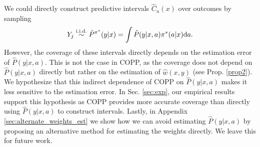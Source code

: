 \begin{importantresultwithtitle}[title=Why not construct intervals using \text{$\hat{P}(y|x, a)$} directly?]\noindent
    We could directly construct predictive intervals $\hat{C}_n(x)$ over outcomes by sampling $$Y_j \overset{\textup{i.i.d.}}{\sim} \hat{P}^{\pi^*}(y|x) = \int \hat{P}(y|x, a)\pi^*(a|x)\mathrm{d}a.$$ However, the coverage of these intervals directly depends on the estimation error of $\hat{P}(y|x, a)$. This is not the case in COPP, as the coverage does not depend on $\hat{P}(y|x, a)$ directly but rather on the estimation of $\hat{w}(x, y)$ (see Prop. \ref{prop2}). We hypothesize that this indirect dependence of COPP on $\hat{P}(y|x, a)$ makes it less sensitive to the estimation error. In Sec. \ref{sec:exp}, our empirical results support this hypothesis as COPP provides more accurate coverage than directly using $\hat{P}(y|x, a)$ to construct intervals. Lastly, in Appendix \ref{sec:alternate_weights_est} we show how we can avoid estimating $\hat{P}(y|x, a)$ by proposing an alternative method for estimating the weights directly. We leave this for future work.
\end{importantresultwithtitle}




